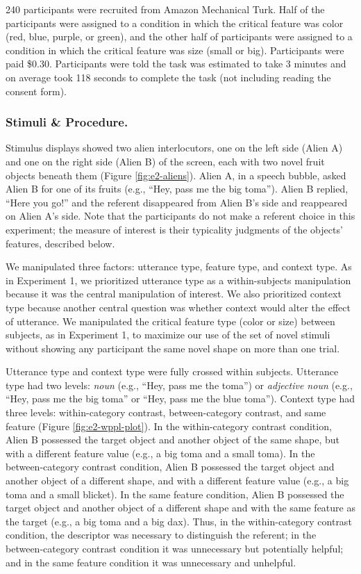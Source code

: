 \documentclass[
  english,
  man,floatsintext]{apa6}
\begin{document}
240 participants were recruited from Amazon Mechanical Turk. Half of the participants were assigned to a condition in which the critical feature was color (red, blue, purple, or green), and the other half of participants were assigned to a condition in which the critical feature was size (small or big). Participants were paid \$0.30. Participants were told the task was estimated to take 3 minutes and on average took 118 seconds to complete the task (not including reading the consent form).

\hypertarget{stimuli-procedure.}{%
\subsubsection{Stimuli \& Procedure.}\label{stimuli-procedure.}}

Stimulus displays showed two alien interlocutors, one on the left side (Alien A) and one on the right side (Alien B) of the screen, each with two novel fruit objects beneath them (Figure \ref{fig:e2-aliens}). Alien A, in a speech bubble, asked Alien B for one of its fruits (e.g., ``Hey, pass me the big toma''). Alien B replied, ``Here you go!'' and the referent disappeared from Alien B's side and reappeared on Alien A's side. Note that the participants do not make a referent choice in this experiment; the measure of interest is their typicality judgments of the objects' features, described below.

We manipulated three factors: utterance type, feature type, and context type. As in Experiment 1, we prioritized utterance type as a within-subjects manipulation because it was the central manipulation of interest. We also prioritized context type because another central question was whether context would alter the effect of utterance. We manipulated the critical feature type (color or size) between subjects, as in Experiment 1, to maximize our use of the set of novel stimuli without showing any participant the same novel shape on more than one trial.

Utterance type and context type were fully crossed within subjects. Utterance type had two levels: \emph{noun} (e.g., ``Hey, pass me the toma'') or \emph{adjective noun} (e.g., ``Hey, pass me the big toma'' or ``Hey, pass me the blue toma''). Context type had three levels: within-category contrast, between-category contrast, and same feature (Figure \ref{fig:e2-wppl-plot}). In the within-category contrast condition, Alien B possessed the target object and another object of the same shape, but with a different feature value (e.g., a big toma and a small toma). In the between-category contrast condition, Alien B possessed the target object and another object of a different shape, and with a different feature value (e.g., a big toma and a small blicket). In the same feature condition, Alien B possessed the target object and another object of a different shape and with the same feature as the target (e.g., a big toma and a big dax). Thus, in the within-category contrast condition, the descriptor was necessary to distinguish the referent; in the between-category contrast condition it was unnecessary but potentially helpful; and in the same feature condition it was unnecessary and unhelpful.
\end{document}
